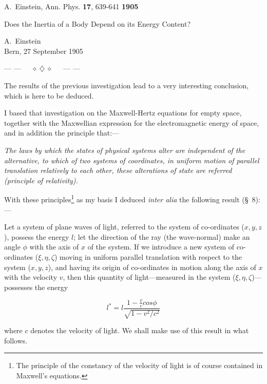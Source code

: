 \documentclass[11pt]{article}
\begin{document}
\noindent A.~Einstein, Ann. Phys. {\bf 17}, 639-641 \hfill {\large \bf 1905}\\[2cm]

\begin{center}
\Large Does the Inertia of a Body Depend on its Energy Content?
\end{center}

\vspace{0.5cm}

\begin{center}
A.~Einstein\\
Bern, 27 September 1905\\
\end{center}

\centerline{--- ---~~~$\diamond~\diamondsuit~\diamond$~~~--- ---}

\vspace{1cm}

The results of the previous investigation lead to a very
interesting conclusion, which is here to be deduced.

I based that investigation on the Maxwell-Hertz equations
for empty space, together with the Maxwellian expression for
the electromagnetic energy of space, and in addition the
principle that:---

{\em
The laws by which the states of physical systems alter are
independent of the alternative, to which of two systems of
coordinates, in uniform motion of parallel translation
relatively to each other, these alterations of state are
referred (principle of relativity).
}

With these principles\footnote{The principle of the constancy of the velocity of light is
of course contained in Maxwell's equations.}
as my
basis I deduced {\em inter alia} the
following result (\S~8):---

Let a system of plane waves of light, referred to the system
of co-ordinates ($x,y,z$), possess the energy $l$; let the
direction of the ray (the wave-normal) make an angle $\phi$
with the axis of $x$ of the system.  If we introduce a new system
of co-ordinates ($\xi,\eta,\zeta$) moving in uniform parallel translation
with respect to the system ($x,y,z$), and having its origin
of co-ordinates in motion along the axis of $x$ with the
velocity $v$, then this quantity of light---measured in the
system ($\xi,\eta,\zeta$)---possesses the energy

\[ l^* = l \frac{1-\frac{v}{c}cos\phi}{\sqrt{1-v^2/c^2}} \]

\noindent
where $c$ denotes the velocity of light.  We shall make use of this
result in what follows.
\end{document}
